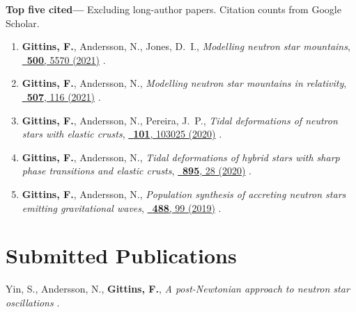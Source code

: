 \textbf{Top five cited---}%
Excluding long-author papers.
Citation counts from Google Scholar.
\begin{enumerate}
    \item \textbf{Gittins, F.}, Andersson, N., Jones, D.~I.,
    \textit{Modelling neutron star mountains},
    \href{https://doi.org/10.1093/mnras/staa3635}%
    {\mnras\ \textbf{500}, 5570 (2021)}
    .
    \item \textbf{Gittins, F.}, Andersson, N.,
    \textit{Modelling neutron star mountains in relativity},
    \href{https://doi.org/10.1093/mnras/stab2048}%
    {\mnras\ \textbf{507}, 116 (2021)}
    .
    \item \textbf{Gittins, F.}, Andersson, N., Pereira, J.~P.,
    \textit{Tidal deformations of neutron stars with elastic crusts},
    \href{https://doi.org/10.1103/PhysRevD.101.103025}%
    {\prd\ \textbf{101}, 103025 (2020)}
    .
    \item \textbf{Gittins, F.}, Andersson, N.,
    \textit{Tidal deformations of hybrid stars with sharp phase transitions and
    elastic crusts},
    \href{https://doi.org/10.3847/1538-4357/ab8aca}%
    {\apj\ \textbf{895}, 28 (2020)}
    .
    \item \textbf{Gittins, F.}, Andersson, N.,
    \textit{Population synthesis of accreting neutron stars emitting
    gravitational waves},
    \href{https://doi.org/10.1093/mnras/stz1719}%
    {\mnras\ \textbf{488}, 99 (2019)}
    .
\end{enumerate}
\else%
\fi

\renewcommand{\citeCount}[1]{}

\section{Submitted Publications}

\secstartswithlist{}%
\begin{etaremune}[start=\value{pubCounter}]
    \renewcommand\labelenumi{[\theenumi]}
%
    \item Yin, S., Andersson, N., \textbf{Gittins, F.},
    \textit{A post-Newtonian approach to neutron star oscillations}
    .
    \citeCount{2}
%
    \setcounter{pubCounter}{\value{enumi}}
\end{etaremune}

